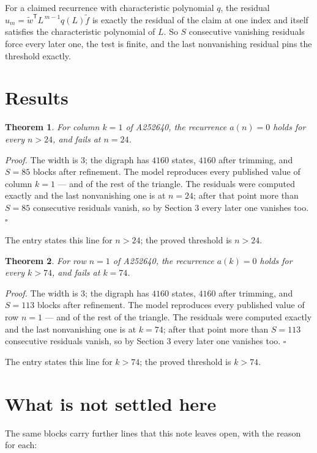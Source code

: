 \documentclass[11pt]{article}
\newtheorem{theorem}{Theorem}
\theoremstyle{definition}
\begin{document}
For a claimed recurrence with characteristic polynomial $q$, the residual $u_m = \tilde w^{\mathsf T}L^{\,m-1}q(L)\tilde f$ is exactly the residual of the claim at one index and itself satisfies the characteristic polynomial of $L$. So $S$ consecutive vanishing residuals force every later one, the test is finite, and the last nonvanishing residual pins the threshold exactly.

\section{Results}

\begin{theorem} For column $k = 1$ of A252640, the recurrence $a(n) = 0$ holds for every $n > 24$, and fails at $n = 24$.\end{theorem}

{\itshape Proof.} The width is $3$; the digraph has $4160$ states, $4160$ after trimming, and $S = 85$ blocks after refinement. The model reproduces every published value of column $k = 1$ --- and of the rest of the triangle. The residuals were computed exactly and the last nonvanishing one is at $n = 24$; after that point more than $S = 85$ consecutive residuals vanish, so by Section 3 every later one vanishes too. $\square$

The entry states this line for $n > 24$; the proved threshold is $n > 24$.

\begin{theorem} For row $n = 1$ of A252640, the recurrence $a(k) = 0$ holds for every $k > 74$, and fails at $k = 74$.\end{theorem}

{\itshape Proof.} The width is $3$; the digraph has $4160$ states, $4160$ after trimming, and $S = 113$ blocks after refinement. The model reproduces every published value of row $n = 1$ --- and of the rest of the triangle. The residuals were computed exactly and the last nonvanishing one is at $k = 74$; after that point more than $S = 113$ consecutive residuals vanish, so by Section 3 every later one vanishes too. $\square$

The entry states this line for $k > 74$; the proved threshold is $k > 74$.

\section{What is not settled here}

The same blocks carry further lines that this note leaves open, with the reason for each:
\end{document}
